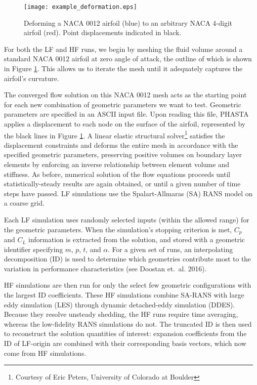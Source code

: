 \documentclass[11pt]{article}
\begin{document}
\begin{figure}[b]
\begin{center}
\texttt{[image: example\_deformation.eps]}
\caption{Deforming a NACA 0012 airfoil ({\color{blue}blue}) to an arbitrary NACA 4-digit airfoil ({\color{red}red}). Point displacements indicated in black.}
\label{fig:example_deformation}
\end{center}
\end{figure}

For both the LF and HF runs, we begin by meshing the fluid volume around a standard NACA 0012 airfoil at zero angle of attack, the outline of which is shown in Figure \ref{fig:example_deformation}. This allows us to iterate the mesh until it adequately captures the airfoil's curvature.

The converged flow solution on this NACA 0012 mesh acts as the starting point for each new combination of geometric parameters we want to test. Geometric parameters are specified in an ASCII input file. Upon reading this file, PHASTA applies a displacement to each node on the surface of the airfoil, represented by the black lines in Figure \ref{fig:example_deformation}. A linear elastic structural solver\footnote{Courtesy of Eric Peters, University of Colorado at Boulder} satisfies the displacement constraints and deforms the entire mesh in accordance with the specified geometric parameters, preserving positive volumes on boundary layer elements by enforcing an inverse relationship between element volume and stiffness. As before, numerical solution of the flow equations proceeds until statistically-steady results are again obtained, or until a given number of time steps have passed. LF simulations use the Spalart-Allmaras (SA) RANS model on a coarse grid.

Each LF simulation uses randomly selected inputs (within the allowed range) for the geometric parameters. When the simulation's stopping criterion is met, $C_p$ and $C_L$ information is extracted from the solution, and stored with a geometric identifier specifying $m$, $p$, $t$, and $\alpha$. For a given set of runs, an interpolating decomposition (ID) is used to determine which geometries contribute most to the variation in performance characteristics (see Doostan et.~al. 2016).

HF simulations are then run for only the select few geometric configurations with the largest ID coefficients. These HF simulations combine SA-RANS with large eddy simulation (LES) through dynamic detached-eddy simulation (DDES). Because they resolve unsteady shedding, the HF runs require time averaging, whereas the low-fidelity RANS simulations do not. The truncated ID is then used to reconstruct the solution quantities of interest: expansion coefficients from the ID of LF-origin are combined with their corresponding basis vectors, which now come from HF simulations.
\end{document}
